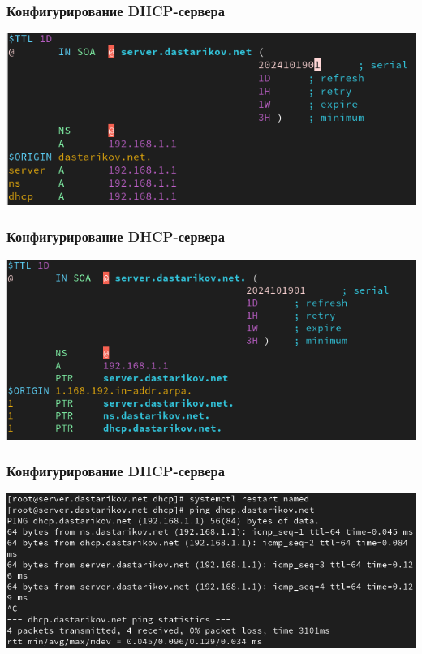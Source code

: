 \begin{frame}
\frametitle{Конфигурирование DHCP-сервера}
    \centering
    \includegraphics[width=\textwidth]{../images/image04.png}
\end{frame}


\begin{frame}
\frametitle{Конфигурирование DHCP-сервера}
    \centering
    \includegraphics[width=\textwidth]{../images/image05.png}
\end{frame}


\begin{frame}
\frametitle{Конфигурирование DHCP-сервера}
    \centering
    \includegraphics[width=\textwidth]{../images/image06.png}
\end{frame}


